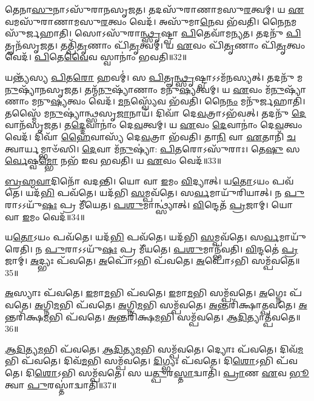 𑌤𑍇𑌨𑌾\-\ul{𑌸𑍁}\-𑌨𑌾\-𑌽𑌸𑍁᳴𑌰𑌾𑌨\-𑌸𑍃𑌜𑌤।
𑌤𑌦𑌸𑍁᳴𑌰𑌾𑌣𑌾𑌮𑌸𑍁\-\ul{𑌰}\-𑌤𑍍𑌵𑌮𑍍।
𑌯 \ul{𑌏}\-𑌵𑌮𑌸𑍁᳴𑌰𑌾𑌣𑌾𑌮𑌸𑍁\-\ul{𑌰}\-𑌤𑍍𑌵𑌂 𑌵𑍇𑌦᳴।
𑌅𑌸𑍁᳴𑌮𑌾\-\ul{𑌨𑍇}\-𑌵 𑌭᳴𑌵𑌤𑌿।
𑌨𑍈\-\ul{𑌨}\-𑌮𑌸𑍁᳴𑌰𑍍𑌜𑌹𑌾𑌤𑌿।
𑌸𑍋𑌽𑌸𑍁᳴𑌰𑌾\-\ul{𑌨𑍍𑌥𑍍𑌸𑍃}\-𑌷𑍍𑌟𑍍𑌵𑌾 \ul{𑌪𑌿}\-𑌤𑍇𑌵𑌾᳴𑌮𑌨𑍍𑌯𑌤।
𑌤𑌦𑌨𑍁᳴ \ul{𑌪𑌿}\-𑌤𑍄𑌨᳴\-𑌸𑍃𑌜𑌤।
𑌤𑌤𑍍𑌪𑌿᳴\-\ul{𑌤𑍃}\-𑌣𑌾𑌂 𑌪𑌿᳴\-\ul{𑌤𑍃}\-𑌤𑍍𑌵𑌮𑍍।
𑌯 \ul{𑌏}\-𑌵𑌂 𑌪𑌿᳴\-\ul{𑌤𑍃}\-𑌣𑌾𑌂 𑌪𑌿᳴\-\ul{𑌤𑍃}\-𑌤𑍍𑌵𑌂 𑌵𑍇𑌦᳴।
\-\ul{𑌪𑌿}\-𑌤𑍇\-\ul{𑌵𑍈}\-𑌵 𑌸𑍍𑌵𑌾𑌨𑌾𑌂॑ 𑌭𑌵𑌤𑌿॥32॥

𑌯𑌨𑍍𑌤𑍍𑌯᳴𑌸𑍍𑌯 \ul{𑌪𑌿}\-𑌤\-\ul{𑌰𑍋} 𑌹𑌵𑌮𑍍॑।
𑌸 \ul{𑌪𑌿}\-𑌤𑍄\-\ul{𑌨𑍍𑌥𑍍𑌸𑍃}\-𑌷𑍍𑌟𑍍𑌵𑌾\-𑌽𑌽𑌮᳴𑌨𑌸𑍍𑌯𑌤𑍍।
𑌤𑌦𑌨𑍁᳴ 𑌮\-\ul{𑌨𑍁}\-𑌷𑍍𑌯𑌾᳴𑌨\-𑌸𑍃𑌜𑌤।
𑌤𑌨𑍍𑌮᳴\-\ul{𑌨𑍁}\-𑌷𑍍𑌯𑌾᳴𑌣𑌾𑌂 𑌮𑌨𑍁\-\ul{𑌷𑍍𑌯}\-𑌤𑍍𑌵𑌮𑍍।
𑌯 \ul{𑌏}\-𑌵𑌂 𑌮᳴\-\ul{𑌨𑍁}\-𑌷𑍍𑌯𑌾᳴𑌣𑌾𑌂 𑌮𑌨𑍁\-\ul{𑌷𑍍𑌯}\-𑌤𑍍𑌵𑌂 𑌵𑍇𑌦᳴।
\-\ul{𑌮}\-\-\ul{𑌨}\-𑌸𑍍𑌵𑍍𑌯𑍇᳴𑌵 𑌭᳴𑌵𑌤𑌿।
𑌨𑍈\-\ul{𑌨𑌂} 𑌮𑌨𑍁᳴𑌰𑍍𑌜𑌹𑌾𑌤𑌿।
𑌤𑌸𑍍𑌮𑍈᳴ 𑌮\-\ul{𑌨𑍁}\-𑌷𑍍𑌯𑌾॑𑌨𑍍𑌥𑍍𑌸𑌸𑍃\-\ul{𑌜𑌾}\-𑌨𑌾𑌯᳴।
𑌦𑌿𑌵𑌾᳴ 𑌦𑍇\-\ul{𑌵}\-𑌤𑍍𑌰𑌾\-𑌽𑌭᳴𑌵𑌤𑍍।
𑌤𑌦𑌨𑍁᳴ \ul{𑌦𑍇}\-𑌵𑌾𑌨᳴\-𑌸𑍃𑌜𑌤।
𑌤\-\ul{𑌦𑍍𑌦𑍇}\-𑌵𑌾𑌨𑌾𑌂॑ 𑌦𑍇\-\ul{𑌵}\-𑌤𑍍𑌵𑌮𑍍।
𑌯 \ul{𑌏}\-𑌵𑌂 \ul{𑌦𑍇}\-𑌵𑌾𑌨𑌾𑌂॑ 𑌦𑍇\-\ul{𑌵}\-𑌤𑍍𑌵𑌂 𑌵𑍇𑌦᳴।
𑌦𑌿𑌵𑌾᳴ \ul{𑌹𑍈}\-𑌵𑌾𑌸𑍍𑌯᳴ 𑌦𑍇\-\ul{𑌵}\-𑌤𑍍𑌰𑌾 𑌭᳴𑌵𑌤𑌿।
𑌤𑌾\-\ul{𑌨𑌿} 𑌵𑌾 \ul{𑌏}\-𑌤𑌾𑌨𑌿᳴ \ul{𑌚}\-𑌤𑍍𑌵𑌾𑌰𑍍𑌯𑌮𑍍𑌭𑌾𑍞᳴𑌸𑌿।
\-\ul{𑌦𑍇}\-𑌵𑌾 𑌮᳴\-\ul{𑌨𑍁}\-𑌷𑍍𑌯𑌾॑: \ul{𑌪𑌿}\-𑌤𑌰𑍋\-𑌽𑌸𑍁᳴𑌰𑌾𑌃।
𑌤𑍇\-\ul{𑌷𑍁} 𑌸\-\ul{𑌰𑍍𑌵𑍇}\-𑌷𑍍𑌵\-\ul{𑌮𑍍𑌭𑍋} 𑌨𑌭᳴ 𑌇𑌵 𑌭𑌵𑌤𑌿।
𑌯 \ul{𑌏}\-𑌵𑌂 𑌵𑍇𑌦᳴॥33॥\anuvakamend[\-\ul{𑌅}\-\-\ul{𑌜𑍀}\-\-\ul{𑌵}\-𑌥𑍍𑌸𑍍𑌵𑌾𑌨𑌾𑌂॑ 𑌭𑌵𑌤𑌿 \ul{𑌦𑍇}\-𑌵𑌾𑌨᳴\-𑌸𑍃𑌜𑌤 \ul{𑌸}\-𑌪𑍍𑌤 𑌚᳴]

\-\ul{𑌬𑍍𑌰}\-\-\ul{𑌹𑍍𑌮}\-\-\ul{𑌵𑌾}\-𑌦𑌿𑌨𑍋᳴ 𑌵𑌦𑌨𑍍𑌤𑌿।
𑌯𑍋 𑌵𑌾 \ul{𑌇}\-𑌮𑌂 \ul{𑌵𑌿}\-𑌦𑍍𑌯𑌾𑌤𑍍।
𑌯\-\ul{𑌤𑍋}\-𑌽𑌯𑌂 𑌪𑌵᳴𑌤𑍇।
𑌯𑌦᳴\-\ul{𑌭𑌿} 𑌪𑌵᳴𑌤𑍇।
𑌯𑌦᳴𑌭𑌿 \ul{𑌸}\-𑌮𑍍𑌪𑌵᳴𑌤𑍇।
𑌸\-\ul{𑌰𑍍𑌵}\-𑌮𑌾𑌯𑍁᳴𑌰𑌿𑌯𑌾𑌤𑍍।
𑌨 \ul{𑌪𑍁}\-𑌰𑌾\-𑌽𑌽𑌯𑍁᳴\-\ul{𑌷𑌃} 𑌪𑍍𑌰 𑌮𑍀᳴𑌯𑍇𑌤।
\-\ul{𑌪}\-\-\ul{𑌶𑍁}\-𑌮𑌾𑌨𑍍𑌥𑍍𑌸𑍍𑌯𑌾॑𑌤𑍍।
\-\ul{𑌵𑌿}\-𑌨𑍍𑌦𑍇𑌤᳴ \ul{𑌪𑍍𑌰}\-𑌜𑌾𑌮𑍍।
𑌯𑍋 𑌵𑌾 \ul{𑌇}\-𑌮𑌂 𑌵𑍇𑌦᳴॥34॥

𑌯\-\ul{𑌤𑍋}\-𑌽𑌯𑌂 𑌪𑌵᳴𑌤𑍇।
𑌯𑌦᳴\-\ul{𑌭𑌿} 𑌪𑌵᳴𑌤𑍇।
𑌯𑌦᳴𑌭𑌿 \ul{𑌸}\-𑌮𑍍𑌪𑌵᳴𑌤𑍇।
𑌸\-\ul{𑌰𑍍𑌵}\-𑌮𑌾𑌯𑍁᳴𑌰𑍇𑌤𑌿।
𑌨 \ul{𑌪𑍁}\-𑌰𑌾\-𑌽𑌽𑌯𑍁᳴\-\ul{𑌷𑌃} 𑌪𑍍𑌰 𑌮𑍀᳴𑌯𑌤𑍇।
\-\ul{𑌪}\-\-\ul{𑌶𑍁}\-𑌮𑌾𑌨𑍍𑌭᳴𑌵𑌤𑌿।
\-\ul{𑌵𑌿}\-𑌨𑍍𑌦𑌤𑍇॑ \ul{𑌪𑍍𑌰}\-𑌜𑌾𑌮𑍍।
\-\ul{𑌅}\-𑌦𑍍𑌭𑍍𑌯𑌃 𑌪᳴𑌵𑌤𑍇।
\-\ul{𑌅}\-𑌪𑍋᳴𑌽𑌭𑌿 𑌪᳴𑌵𑌤𑍇।
\-\ul{𑌅}\-𑌪𑍋᳴𑌽𑌭𑌿 𑌸𑌮𑍍𑌪᳴𑌵𑌤𑍇॥35॥

\-\ul{𑌅}\-𑌸𑍍𑌯𑌾𑌃 𑌪᳴𑌵𑌤𑍇।
\-\ul{𑌇}\-𑌮𑌾\-\ul{𑌮}\-𑌭𑌿 𑌪᳴𑌵𑌤𑍇।
\-\ul{𑌇}\-𑌮𑌾\-\ul{𑌮}\-𑌭𑌿 𑌸𑌮𑍍𑌪᳴𑌵𑌤𑍇।
\-\ul{𑌅}\-𑌗𑍍𑌨𑍇𑌃 𑌪᳴𑌵𑌤𑍇।
\-\ul{𑌅}\-𑌗𑍍𑌨𑌿\-\ul{𑌮}\-𑌭𑌿 𑌪᳴𑌵𑌤𑍇।
\-\ul{𑌅}\-𑌗𑍍𑌨𑌿\-\ul{𑌮}\-𑌭𑌿 𑌸𑌮𑍍𑌪᳴𑌵𑌤𑍇।
\-\ul{𑌅}\-𑌨𑍍𑌤𑌰𑌿᳴𑌕𑍍𑌷𑌾𑌤𑍍𑌪𑌵𑌤𑍇।
\-\ul{𑌅}\-𑌨𑍍𑌤𑌰𑌿᳴𑌕𑍍𑌷\-\ul{𑌮}\-𑌭𑌿 𑌪᳴𑌵𑌤𑍇।
\-\ul{𑌅}\-𑌨𑍍𑌤𑌰𑌿᳴𑌕𑍍𑌷\-\ul{𑌮}\-𑌭𑌿 𑌸𑌮𑍍𑌪᳴𑌵𑌤𑍇।
\-\ul{𑌆}\-\-\ul{𑌦𑌿}\-𑌤𑍍𑌯𑌾𑌤𑍍𑌪᳴𑌵𑌤𑍇॥36॥

\-\ul{𑌆}\-\-\ul{𑌦𑌿}\-𑌤𑍍𑌯\-\ul{𑌮}\-𑌭𑌿 𑌪᳴𑌵𑌤𑍇।
\-\ul{𑌆}\-\-\ul{𑌦𑌿}\-𑌤𑍍𑌯\-\ul{𑌮}\-𑌭𑌿 𑌸𑌮𑍍𑌪᳴𑌵𑌤𑍇।
𑌦𑍍𑌯𑍋𑌃 𑌪᳴𑌵𑌤𑍇।
𑌦𑌿𑌵᳴\-\ul{𑌮}\-𑌭𑌿 𑌪᳴𑌵𑌤𑍇।
𑌦𑌿𑌵᳴\-\ul{𑌮}\-𑌭𑌿 𑌸𑌮𑍍𑌪᳴𑌵𑌤𑍇।
\-\ul{𑌦𑌿}\-𑌗𑍍𑌭𑍍𑌯𑌃 𑌪᳴𑌵𑌤𑍇।
𑌦𑌿\-\ul{𑌶𑍋}\-𑌽𑌭𑌿 𑌪᳴𑌵𑌤𑍇।
𑌦𑌿\-\ul{𑌶𑍋}\-𑌽𑌭𑌿 𑌸𑌮𑍍𑌪᳴𑌵𑌤𑍇।
𑌸 𑌯\-\ul{𑌤𑍍𑌪𑍁}\-𑌰\-\ul{𑌸𑍍𑌤𑌾}\-𑌦𑍍𑌵𑌾𑌤𑌿᳴।
\-\ul{𑌪𑍍𑌰𑌾}\-𑌣 \ul{𑌏}\-𑌵 \ul{𑌭𑍂}\-𑌤𑍍𑌵𑌾 \ul{𑌪𑍁}\-𑌰𑌸𑍍𑌤𑌾॑𑌦𑍍𑌵𑌾𑌤𑌿॥37॥


